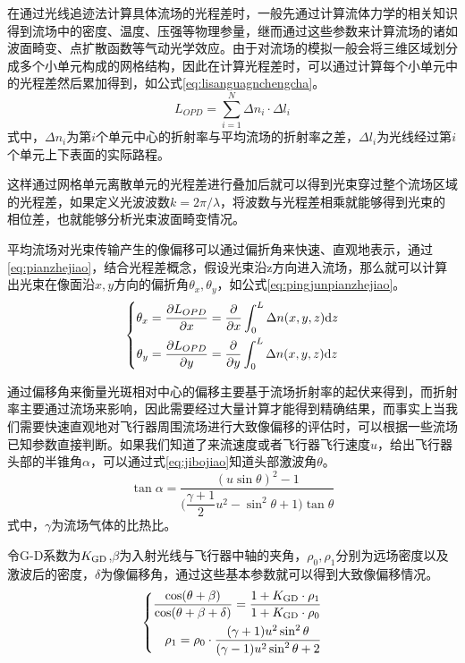 在通过光线追迹法计算具体流场的光程差时，一般先通过计算流体力学的相关知识得到流场中的密度、温度、压强等物理参量，继而通过这些参数来计算流场的诸如波面畸变、点扩散函数等气动光学效应。由于对流场的模拟一般会将三维区域划分成多个小单元构成的网格结构，因此在计算光程差时，可以通过计算每个小单元中的光程差然后累加得到，如公式\eqref{eq:lisanguagnchengcha}。
\begin{equation}
L_{OPD}=\sum\limits_{i=1}^{N}\Delta n_i\cdot\Delta l_i
\label{eq:lisanguagnchengcha}
\end{equation}
式中，$\Delta n_i$为第$i$个单元中心的折射率与平均流场的折射率之差，$\Delta l_i$为光线经过第$i$个单元上下表面的实际路程。

这样通过网格单元离散单元的光程差进行叠加后就可以得到光束穿过整个流场区域的光程差，如果定义光波波数$k=2\pi/\lambda$，将波数与光程差相乘就能够得到光束的相位差，也就能够分析光束波面畸变情况。

平均流场对光束传输产生的像偏移可以通过偏折角来快速、直观地表示，通过\eqref{eq:pianzhejiao}，结合光程差概念，假设光束沿z方向进入流场，那么就可以计算出光束在像面沿$x,y$方向的偏折角$\theta_x,\theta_y$，如公式\eqref{eq:pingjunpianzhejiao}。
\begin{equation}
\left\{
\begin{aligned}
\theta_x&=\frac{\partial L_{OPD}}{\partial x}=\frac{\partial}{\partial x}\int_0^L\Delta n(x,y,z){\rm d}z\\
\theta_y&=\frac{\partial L_{OPD}}{\partial y}=\frac{\partial}{\partial y}\int_0^L\Delta n(x,y,z){\rm d}z
\end{aligned}
\right.\label{eq:pingjunpianzhejiao}
\end{equation}

通过偏移角来衡量光斑相对中心的偏移主要基于流场折射率的起伏来得到，而折射率主要通过流场来影响，因此需要经过大量计算才能得到精确结果，而事实上当我们需要快速直观地对飞行器周围流场进行大致像偏移的评估时，可以根据一些流场已知参数直接判断。如果我们知道了来流速度或者飞行器飞行速度$u$，给出飞行器头部的半锥角$\alpha$，可以通过式\eqref{eq:jibojiao}知道头部激波角$\theta$。
\begin{equation}
\tan\alpha=\frac{(u\sin\theta)^2-1}{\Big(\dfrac{\gamma+1}{2}u^2-\sin^2\theta+1\Big)\tan\theta}
\label{eq:jibojiao}
\end{equation}
式中，$\gamma$为流场气体的比热比。

令G-D系数为$K_{\rm GD}$,$\beta$为入射光线与飞行器中轴的夹角，$\rho_0,\rho_1$分别为远场密度以及激波后的密度，$\delta$为像偏移角，通过这些基本参数就可以得到大致像偏移情况。
\begin{equation}
\left\{
\begin{aligned}
\frac{\cos(\theta+\beta)}{\cos(\theta+\beta+\delta)}=\frac{1+K_{\rm GD}\cdot\rho_1}{1+K_{\rm GD}\cdot\rho_0}\\
\rho_1=\rho_0\cdot\frac{(\gamma+1)u^2\sin^2\theta}{(\gamma-1)u^2\sin^2\theta+2}
\end{aligned}
\right.\label{eq:jibopianyi}
\end{equation}

